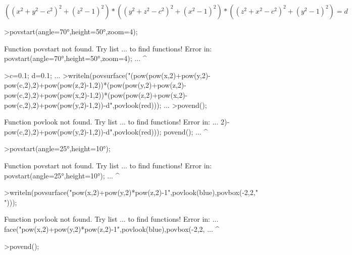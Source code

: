 \documentclass{article}
\begin{document}
\begin{eulernotebook}
\begin{eulercomment}
\begin{eulercomment}
\begin{eulercomment}
\begin{eulercomment}
\begin{eulercomment}
\end{eulercomment}
\begin{eulerformula}
\[
((x^2+y^2-c^2)^2+(z^2-1)^2)*((y^2+z^2-c^2)^2+(x^ 2-1)^2)*((z^2+x^2-c^2)^2+(y^2-1)^2)=d
\]
\end{eulerformula}
\begin{eulerprompt}
>povstart(angle=70°,height=50°,zoom=4);
\end{eulerprompt}
\begin{euleroutput}
  Function povstart not found.
  Try list ... to find functions!
  Error in:
  povstart(angle=70°,height=50°,zoom=4); ...
                                       ^
\end{euleroutput}
\begin{eulerprompt}
>c=0.1; d=0.1; ...
>writeln(povsurface("(pow(pow(x,2)+pow(y,2)-pow(c,2),2)+pow(pow(z,2)-1,2))*(pow(pow(y,2)+pow(z,2)-pow(c,2),2)+pow(pow(x,2)-1,2))*(pow(pow(z,2)+pow(x,2)-pow(c,2),2)+pow(pow(y,2)-1,2))-d",povlook(red))); ...
>povend();
\end{eulerprompt}
\begin{euleroutput}
  Function povlook not found.
  Try list ... to find functions!
  Error in:
  ... 2)-pow(c,2),2)+pow(pow(y,2)-1,2))-d",povlook(red))); povend(); ...
                                                       ^
\end{euleroutput}
\begin{eulerprompt}
>povstart(angle=25°,height=10°); 
\end{eulerprompt}
\begin{euleroutput}
  Function povstart not found.
  Try list ... to find functions!
  Error in:
  povstart(angle=25°,height=10°);  ...
                                ^
\end{euleroutput}
\begin{eulerprompt}
>writeln(povsurface("pow(x,2)+pow(y,2)*pow(z,2)-1",povlook(blue),povbox(-2,2,"")));
\end{eulerprompt}
\begin{euleroutput}
  Function povlook not found.
  Try list ... to find functions!
  Error in:
  ... face("pow(x,2)+pow(y,2)*pow(z,2)-1",povlook(blue),povbox(-2,2, ...
                                                       ^
\end{euleroutput}
\begin{eulerprompt}
>povend();
\end{eulerprompt}
\begin{eulerprompt}

\end{eulerprompt}
\end{eulercomment}
\end{eulercomment}
\end{eulercomment}
\end{eulercomment}
\end{eulernotebook}
\end{document}
